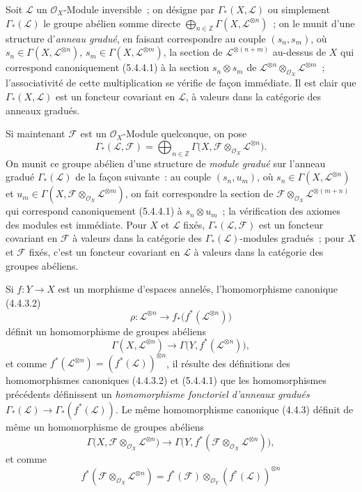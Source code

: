 \begin{env}[5.4.6]
\label{0.5.4.6-fr}
Soit $\mathcal{L}$ un $\mathcal{O}_X$-Module inversible~; on désigne par
$\Gamma_*(X,\mathcal{L})$ ou simplement $\Gamma_*(\mathcal{L})$ le groupe
abélien somme directe
$\bigoplus_{n\in\mathbb{Z}}\Gamma(X,\mathcal{L}^{\otimes n})$~; on le munit
d'une structure d'\emph{anneau gradué}, en faisant correspondre au couple
$(s_n,s_m)$, où $s_n\in\Gamma(X,\mathcal{L}^{\otimes n})$,
$s_m\in\Gamma(X,\mathcal{L}^{\otimes m})$, la section de
$\mathcal{L}^{\otimes(n+m)}$ au-dessus de $X$ qui correspond canoniquement
(5.4.4.1) à la section $s_n\otimes s_m$ de
$\mathcal{L}^{\otimes n}\otimes_{\mathcal{O}_X}\mathcal{L}^{\otimes m}$~;
l'associativité de cette multiplication se vérifie de façon immédiate. Il est
clair que $\Gamma_*(X,\mathcal{L})$ est un foncteur covariant en
$\mathcal{L}$, à valeurs dans la catégorie des anneaux gradués.

Si maintenant $\mathcal{F}$ est un $\mathcal{O}_X$-Module quelconque, on pose
\[
  \Gamma_*(\mathcal{L},\mathcal{F})
  =\bigoplus_{n\in\mathbb{Z}}
   \Gamma\bigl(X,
     \mathcal{F}\otimes_{\mathcal{O}_X}\mathcal{L}^{\otimes n}\bigr).
\]
On munit ce groupe abélien d'une structure de \emph{module gradué} sur
l'anneau gradué $\Gamma_*(\mathcal{L})$ de la façon suivante~: au couple
$(s_n,u_m)$, où $s_n\in\Gamma(X,\mathcal{L}^{\otimes n})$ et
$u_m\in\Gamma(X,
\mathcal{F}\otimes_{\mathcal{O}_X}\mathcal{L}^{\otimes m})$, on fait
correspondre la section de
$\mathcal{F}\otimes_{\mathcal{O}_X}\mathcal{L}^{\otimes(m+n)}$ qui correspond
canoniquement (5.4.4.1) à $s_n\otimes u_m$~; la vérification des axiomes des
modules est immédiate. Pour $X$ et $\mathcal{L}$ fixés,
$\Gamma_*(\mathcal{L},\mathcal{F})$ est un foncteur covariant en
$\mathcal{F}$ à valeurs dans la catégorie des
$\Gamma_*(\mathcal{L})$-modules gradués~; pour $X$ et $\mathcal{F}$ fixés,
c'est un foncteur covariant en $\mathcal{L}$ à valeurs dans la catégorie des
groupes abéliens.

Si $f:Y\to X$ est un morphisme d'espaces annelés, l'homomorphisme canonique
(4.4.3.2)
\[
  \rho:\mathcal{L}^{\otimes n}
  \longrightarrow
  f_*\bigl(f^*(\mathcal{L}^{\otimes n})\bigr)
\]
définit un homomorphisme de groupes abéliens
\[
  \Gamma(X,\mathcal{L}^{\otimes n})
  \longrightarrow
  \Gamma\bigl(Y,f^*(\mathcal{L}^{\otimes n})\bigr),
\]
et comme
$f^*(\mathcal{L}^{\otimes n})=(f^*(\mathcal{L}))^{\otimes n}$, il résulte des
définitions des homomorphismes canoniques (4.4.3.2) et (5.4.4.1) que les
homomorphismes précédents définissent un \emph{homomorphisme fonctoriel
d'anneaux gradués}
$\Gamma_*(\mathcal{L})\to\Gamma_*(f^*(\mathcal{L}))$. Le même homomorphisme
canonique (4.4.3) définit de même un homomorphisme de groupes abéliens
\[
  \Gamma\bigl(X,
    \mathcal{F}\otimes_{\mathcal{O}_X}\mathcal{L}^{\otimes n}\bigr)
  \longrightarrow
  \Gamma\bigl(Y,
    f^*(\mathcal{F}\otimes_{\mathcal{O}_X}\mathcal{L}^{\otimes n})\bigr),
\]
et comme
\[
  f^*(\mathcal{F}\otimes_{\mathcal{O}_X}\mathcal{L}^{\otimes n})
  =f^*(\mathcal{F})\otimes_{\mathcal{O}_Y}
   (f^*(\mathcal{L}))^{\otimes n}
  \tag{4.3.3.1}
\]


\end{env}
